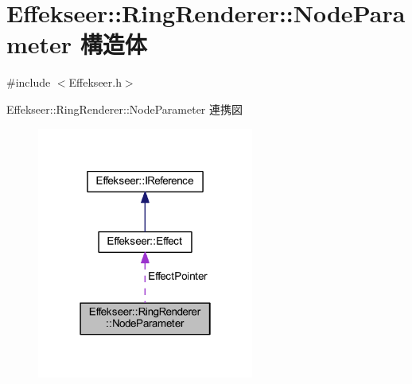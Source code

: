 \hypertarget{struct_effekseer_1_1_ring_renderer_1_1_node_parameter}{}\section{Effekseer\+:\+:Ring\+Renderer\+:\+:Node\+Parameter 構造体}
\label{struct_effekseer_1_1_ring_renderer_1_1_node_parameter}


{\ttfamily \#include $<$Effekseer.\+h$>$}



Effekseer\+:\+:Ring\+Renderer\+:\+:Node\+Parameter 連携図\nopagebreak
\begin{figure}[H]
\begin{center}
\leavevmode
\includegraphics[width=202pt]{struct_effekseer_1_1_ring_renderer_1_1_node_parameter__coll__graph}
\end{center}
\end{figure}
